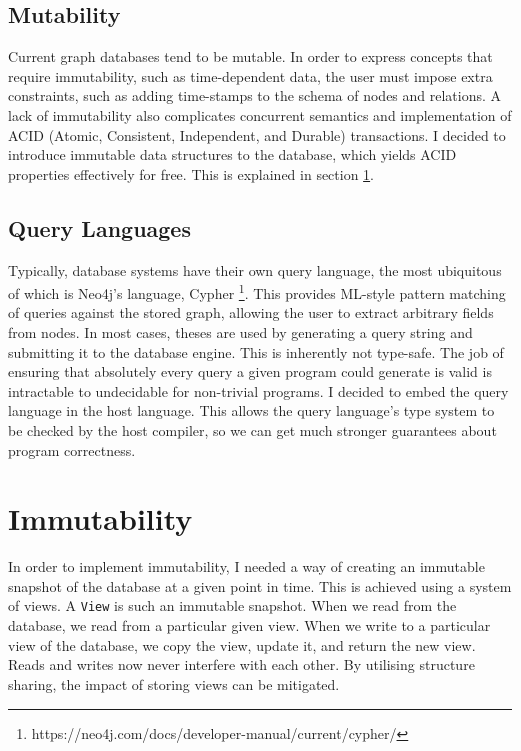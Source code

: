 \documentclass[12pt,a4paper,twoside,openright]{report}
\newcommand\codeName[1]{\texttt{#1}}
\begin{document}
\subsection{Mutability}
Current graph databases tend to be mutable. In order to express concepts that require immutability, such as time-dependent data, the user must impose extra constraints, such as adding time-stamps to the schema of  nodes and relations. A lack of immutability also complicates concurrent semantics and implementation of ACID (Atomic, Consistent, Independent, and Durable) transactions. I decided to introduce immutable data structures  to the database, which yields ACID properties effectively for free. This is explained in section \ref{immutability}.
\subsection{Query Languages}
Typically, database systems have their own query language, the most ubiquitous of which is Neo4j's language, Cypher \footnote{https://neo4j.com/docs/developer-manual/current/cypher/}. This provides ML-style pattern matching of queries against the stored graph, allowing the user to extract arbitrary fields from nodes. In most cases, theses are used by generating a query string and submitting it to the database engine. This is inherently not type-safe. The job of ensuring that absolutely every query a given program could generate is valid is intractable to undecidable for non-trivial programs. I decided to embed the query language in the host language. This allows the query language's type system to be checked by the host compiler, so we can get much stronger guarantees about program correctness.

\section{Immutability}\label{immutability}
In order to implement immutability, I needed a way of creating an immutable snapshot of the database at a given point in time. This is achieved using a system of views. A \codeName{View} is such an immutable snapshot. When we read from the database, we read from a particular given view. When we write to a particular view of the database, we copy the view, update it, and return the new view. Reads and writes now never interfere with each other. By utilising structure sharing, the impact of storing views can be mitigated.
\end{document}
